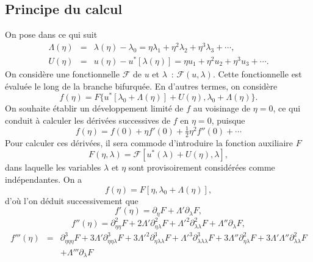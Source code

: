 \documentclass[12pt, final]{amsart}
\begin{document}
\subsection{Principe du calcul}\label{sec20220107121442}

On pose dans ce qui suit
\begin{eqnarray}
  \Lambda (\eta) & = & \lambda (\eta) - \lambda_0 = \eta \lambda_1 + \eta^2
  \lambda_2 + \eta^3 \lambda_3 + \cdots,  \label{eq20211112155446}\\
  U (\eta) & = & u (\eta) - u^{\ast} [\lambda (\eta)] = \eta u_1 + \eta^2 u_2
  + \eta^3 u_3 + \cdots .  \label{eq20211112113028}
\end{eqnarray}
On considère une fonctionnelle $\mathcal{F}$ de $u$ et $\lambda$~:
$\mathcal{F} (u, \lambda)$. Cette fonctionnelle est évaluée le long de
la branche bifurquée. En d'autres termes, on considère
\begin{equation}
  f (\eta) = F \{ u^{\ast} [\lambda_0 + \Lambda (\eta)] + U (\eta), \lambda_0
  + \Lambda (\eta) \} .
\end{equation}
On souhaite établir un développement limité de $f$ au voisinage de
$\eta = 0$, ce qui conduit à calculer les dérivées successives de
$f$ en $\eta = 0$, puisque
\begin{equation}
  f (\eta) = f (0) + \eta f' (0) + \tfrac{1}{2} \eta^2 f'' (0) + \cdots
\end{equation}
Pour calculer ces dérivées, il sera commode d'introduire la fonction
auxiliaire $F$
\begin{equation}
  F (\eta, \lambda) =\mathcal{F} [u^{\ast} (\lambda) + U (\eta), \lambda],
\end{equation}
dans laquelle les variables $\lambda$ et $\eta$ sont provisoirement
considérées comme indépendantes. On a
\begin{equation}
  f (\eta) = F [\eta, \lambda_0 + \Lambda (\eta)],
\end{equation}
d'où l'on déduit successivement que
\begin{equation}
  \label{eq20211112162417} f' (\eta) = \partial_{\eta} F + \Lambda'
  \partial_{\lambda} F,
\end{equation}
\begin{equation}
  \label{eq20211112165810} f'' (\eta) = \partial_{\eta  \eta}^2 F + 2
  \Lambda' \partial_{\eta  \lambda}^2 {F + \Lambda'}^2
  \partial_{\lambda  \lambda}^2 F + \Lambda'' \partial_{\lambda} F,
\end{equation}
\begin{eqnarray}
  \label{eq20211112173223} f''' (\eta) & = & \partial_{\eta  \eta
   \eta}^3 F + 3 \Lambda' \partial_{\eta  \eta
  \lambda}^3 {F + 3 \Lambda'}^2 \partial_{\eta  \lambda
  \lambda}^3 {F + \Lambda'}^3 \partial_{\lambda  \lambda
  \lambda}^3 F + 3 \Lambda'' \partial_{\eta  \lambda}^2 F + 3 \Lambda'
  \Lambda'' \partial_{\lambda  \lambda}^2 F \nonumber\\
  &  &  + \Lambda''' \partial_{\lambda} F
\end{eqnarray}
\end{document}
